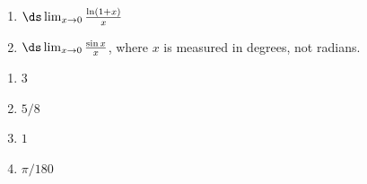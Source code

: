 \begin{enumialphparenastyle}
\begin{ex}
\begin{enumerate}
\item {$\ds \lim_{x\to0}\frac{\ln (1+x)}{x}$}

\item {$\ds \lim_{x\to0}\frac{\sin x}{x}$, where $x$ is measured in degrees, not radians.}

\end{enumerate}

\begin{sol}
\begin{enumerate}
\item {$3$}
\item {$5/8$}
\item {$1$}
\item {$\pi/180$}
\end{enumerate}
\end{sol}

\end{ex}


\end{enumialphparenastyle}
